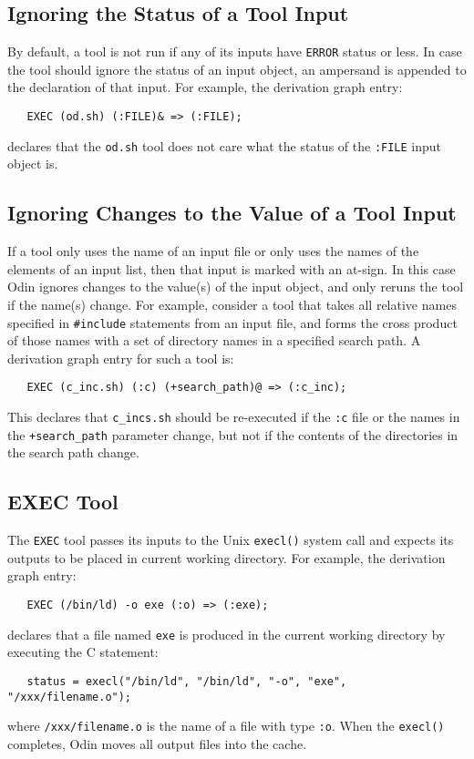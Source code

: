 \documentclass[hidelinks]{report}
\newcommand{\ex}{\tt}   %
\begin{document}
\subsection{Ignoring the Status of a Tool Input}

By default, a tool is not run if any of its inputs 
have {\ex ERROR} status or less.
In case the tool should ignore the status of an input object,
an ampersand is appended to the declaration of that input.
For example, the derivation graph entry:
\begin{verbatim}
   EXEC (od.sh) (:FILE)& => (:FILE);
\end{verbatim}
declares that the {\ex od.sh} tool does not care
what the status of the {\ex :FILE} input object is.

\subsection{Ignoring Changes to the Value of a Tool Input}

If a tool only uses the name of an input file
or only uses the names of the elements of an input list,
then that input is marked with an at-sign.
In this case Odin ignores changes to the value(s) of the input object,
and only reruns the tool if the name(s) change.
For example, consider a tool that takes all relative names specified
in {\ex \#include} statements from an input file,
and forms the cross product of those names with a set of directory names
in a specified search path.
A derivation graph entry for such a tool is:
\begin{verbatim}
   EXEC (c_inc.sh) (:c) (+search_path)@ => (:c_inc);
\end{verbatim}
This declares that {\ex c\_incs.sh} should be re-executed
if the {\ex :c} file or the names in the {\ex +search\_path} parameter change,
but not if the contents of the directories in the search path change.

\subsection{EXEC Tool}
\label{exec}

The {\ex EXEC} tool passes its inputs to the Unix {\ex execl()} system call
and expects its outputs to be placed in current working directory.
For example, the derivation graph entry:
\begin{verbatim}
   EXEC (/bin/ld) -o exe (:o) => (:exe);
\end{verbatim}
declares that a file named {\ex exe}
is produced in the current working directory by executing the C statement:
\begin{verbatim}
   status = execl("/bin/ld", "/bin/ld", "-o", "exe", "/xxx/filename.o");
\end{verbatim}
where {\ex /xxx/filename.o} is the name of a file with type {\ex :o}.
When the {\ex execl()} completes,
Odin moves all output files into the cache.
\end{document}
